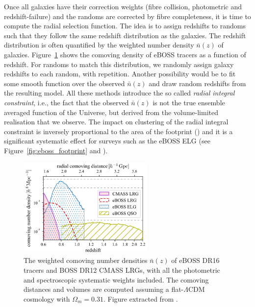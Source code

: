 Once all galaxies have their correction weights 
(fibre collision, photometric and redshift-failure) 
and the randoms are corrected by fibre completeness, 
it is time to compute the radial selection function. 
The idea is to assign redshifts to randoms 
such that they follow the same redshift distribution as the galaxies. 
The redshift distribution is often quantified by the weighted
number density $\bar{n}(z)$ of galaxies. 
Figure~\ref{fig:eboss_z_distrib} shows the comoving density of eBOSS tracers 
as a function of redshift. 
For randoms to match this distribution, we randomly assign galaxy 
redshifts to each random, with repetition. Another possibility would be to 
fit some smooth function over the observed $\bar{n}(z)$ and draw random redshifts
from the resulting model. All these methods introduce the so called 
\emph{radial integral constraint}, i.e., the fact that the observed $\bar{n}(z)$ is 
not the true ensemble averaged function of the Universe, but derived from the 
volume-limited realisation that we observe. 
The impact on clustering of the radial integral constraint is 
inversely proportional to the area of the footprint
(\cite{demattiaIntegralConstraintsSpectroscopic2019}) and it is a significant systematic effect 
for surveys such as the eBOSS ELG (see Figure~\ref{fig:eboss_footprint} and 
\cite{tamoneCompletedSDSSIVExtended2020, demattiaCompletedSDSSIVExtended2021}). 


\begin{figure}
    \centering 
    \includegraphics[width=0.6\textwidth]{fig/galaxies/eboss_z_distribution.png}
    \caption{ The weighted comoving number densities $\bar{n}(z)$ of eBOSS DR16 tracers
    and BOSS DR12 CMASS LRGs, with all the photometric and spectroscopic
    systematic weights included. 
    The comoving distances and volumes are computed assuming a flat-$\Lambda$CDM 
    cosmology with $\Omega_m = 0.31$. 
    Figure extracted from \cite{zhaoCompletedSDSSIVExtended2021}.} 
    \label{fig:eboss_z_distrib}
\end{figure}


